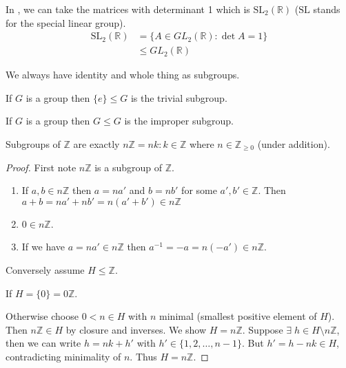 \begin{example}
\protect\hypertarget{exm:sltwo}{}\label{exm:sltwo}
In , we can take the matrices with determinant 1 which is \(\mathrm{SL}_2(\mathbb{R})\) (\(\mathrm{SL}\) stands for the special linear group).
\begin{align*}
  \mathrm{SL}_2(\mathbb{R}) &= \{ A \in GL_2(\mathbb{R}) : \det A = 1 \} \\
    &\leq GL_2(\mathbb{R})
\end{align*}
\end{example}

We always have identity and whole thing as subgroups.

\begin{example}
If \(G\) is a group then \(\{ e \} \leq G\) is the trivial subgroup.
\end{example}

\begin{example}
If \(G\) is a group then \(G \leq G\) is the improper subgroup.
\end{example}

\begin{proposition}
\protect\hypertarget{prp:nZ}{}\label{prp:nZ}Subgroups of \(\mathbb{Z}\) are exactly \(n \mathbb{Z} = {nk : k \in \mathbb{Z}}\) where \(n \in \mathbb{Z}_{\geq 0}\) (under addition).
\end{proposition}

\begin{proof}
First note \(n \mathbb{Z}\) is a subgroup of \(\mathbb{Z}\).

\begin{enumerate}
\def\labelenumi{\alph{enumi}.}
\item
  If \(a, b \in n \mathbb{Z}\) then \(a = na'\) and \(b = nb'\) for some \(a', b' \in \mathbb{Z}\).
  Then \(a + b = na' + nb' = n (a' + b') \in n \mathbb{Z}\)
\item
  \(0 \in n \mathbb{Z}\).
\item
  If we have \(a = na' \in n \mathbb{Z}\) then \(a^{-1} = -a = n(-a') \in n \mathbb{Z}\).
\end{enumerate}

Conversely assume \(H \leq \mathbb{Z}\).

If \(H = \{ 0 \} = 0 \mathbb{Z}\).

Otherwise choose \(0 < n \in H\) with \(n\) minimal (smallest positive element of \(H\)).
Then \(n \mathbb{Z} \in H\) by closure and inverses. We show \(H = n \mathbb{Z}\). Suppose \(\exists \; h \in H \setminus n \mathbb{Z}\), then we can write \(h = nk + h'\) with \(h' \in \{ 1, 2, \ldots, n -1 \}\). But \(h' = h - nk \in H\), contradicting minimality of \(n\). Thus \(H = n \mathbb{Z}\).
\end{proof}

